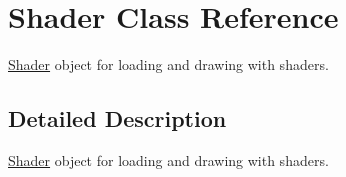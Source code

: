 \hypertarget{class_shader}{\section{Shader Class Reference}
\label{class_shader}
}


\hyperlink{class_shader}{Shader} object for loading and drawing with shaders.  




\subsection{Detailed Description}
\hyperlink{class_shader}{Shader} object for loading and drawing with shaders. 